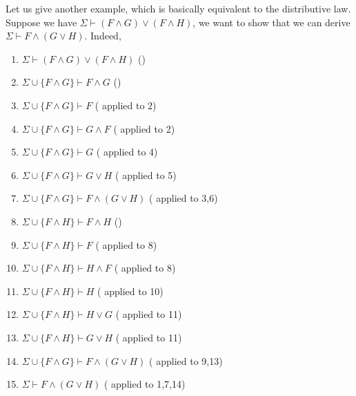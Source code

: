 \begin{prooftree}
\end{prooftree}

\begin{prooftree}
\end{prooftree}

\begin{prooftree}
\end{prooftree}

Let us give another example, which is basically equivalent to the distributive law. Suppose we have $\Sigma\vdash (F\wedge G)\vee(F\wedge H)$, we want to show that we can derive $\Sigma\vdash F\wedge(G\vee H)$. Indeed,
\begin{enumerate}
	\item $\Sigma\vdash (F\wedge G)\vee(F\wedge H)$ \hfill ()%
	
	\item $\Sigma\cup\{F\wedge G\} \vdash F\wedge G$ \hfill ()%
	\item $\Sigma\cup\{F\wedge G\} \vdash F$ \hfill ( applied to 2)%
	\item $\Sigma\cup\{F\wedge G\} \vdash G\wedge F$ \hfill ( applied to 2)%
	\item $\Sigma\cup\{F\wedge G\} \vdash G$ \hfill ( applied to 4)%
	\item $\Sigma\cup\{F\wedge G\}\vdash G\vee H$ \hfill ( applied to 5)%
	\item $\Sigma\cup\{F\wedge G\}\vdash F\wedge(G\vee H)$ \hfill ( applied to 3,6)%

	\item $\Sigma\cup\{F\wedge H\} \vdash F\wedge H$ \hfill ()%
	\item $\Sigma\cup\{F\wedge H\} \vdash F$ \hfill ( applied to 8)%
	\item $\Sigma\cup\{F\wedge H\} \vdash H\wedge F$ \hfill ( applied to 8)%
	\item $\Sigma\cup\{F\wedge H\} \vdash H$ \hfill ( applied to 10)%
	\item $\Sigma\cup\{F\wedge H\}\vdash H\vee G$ \hfill ( applied to 11)%
	\item $\Sigma\cup\{F\wedge H\}\vdash G\vee H$ \hfill ( applied to 11)%
	\item $\Sigma\cup\{F\wedge G\}\vdash F\wedge(G\vee H)$ \hfill ( applied to 9,13)%

	\item $\Sigma\vdash F\wedge(G\vee H)$ \hfill ( applied to 1,7,14)%
\end{enumerate}

